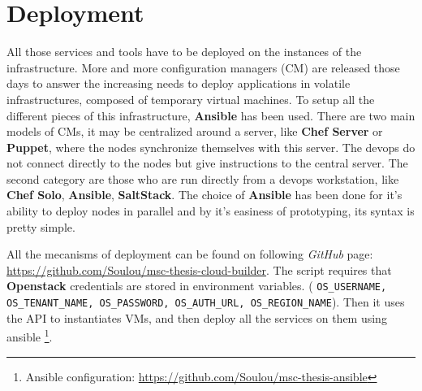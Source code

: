 \section{Deployment}

All those services and tools have to be deployed on the instances of the
infrastructure. More and more configuration managers (CM) are released those days to
answer the increasing needs to deploy applications in volatile infrastructures,
composed of temporary virtual machines. To setup all the different pieces of
this infrastructure, \textbf{Ansible} has been used. There are two main models
of CMs, it may be centralized around a server, like \textbf{Chef Server} or \textbf{Puppet},
where the nodes synchronize themselves with this server. The devops do not connect
directly to the nodes but give instructions to the central server. The second
category are those who are run directly from a devops workstation, like \textbf{Chef Solo},
\textbf{Ansible}, \textbf{SaltStack}. The choice of \textbf{Ansible} has been done
for it's ability to deploy nodes in parallel and by it's easiness of prototyping,
its syntax is pretty simple.

All the mecanisms of deployment can be found on following \textit{GitHub} page:
\url{https://github.com/Soulou/msc-thesis-cloud-builder}. The script requires
that \textbf{Openstack} credentials are stored in environment variables. (
\texttt{OS\_USERNAME, OS\_TENANT\_NAME, OS\_PASSWORD, OS\_AUTH\_URL,
OS\_REGION\_NAME}). Then it uses the API to instantiates VMs, and then deploy
all the services on them using ansible \footnote{Ansible configuration:
\url{https://github.com/Soulou/msc-thesis-ansible}}.

